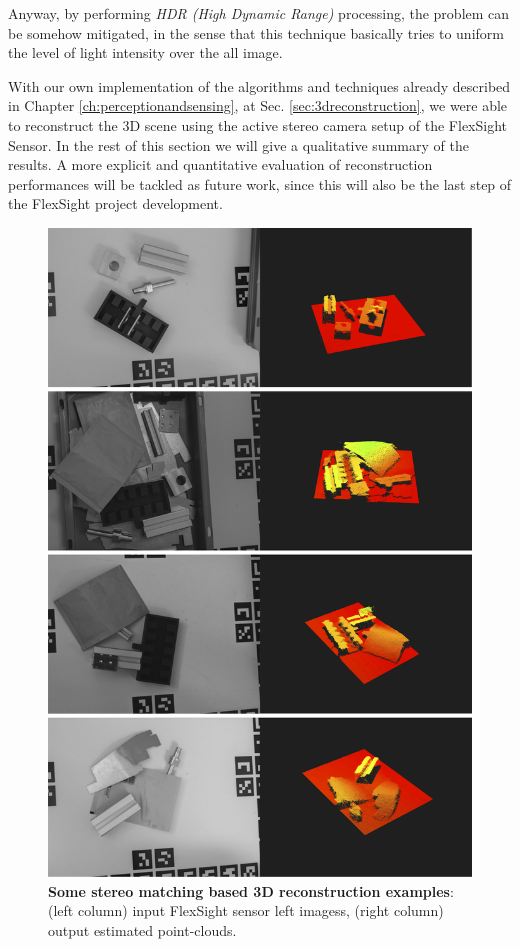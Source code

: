 Anyway, by performing \emph{HDR (High Dynamic Range)} processing, the problem can be somehow mitigated, in the sense that this technique basically tries to uniform the level of light intensity over the all image.

With our own implementation of the algorithms and techniques already described in Chapter \ref{ch:perceptionandsensing}, at Sec. \ref{sec:3dreconstruction}, we were able to reconstruct the 3D scene using the active stereo camera setup of the FlexSight Sensor. In the rest of this section we will give a qualitative summary of the results. A more explicit and quantitative evaluation of reconstruction performances will be tackled as future work, since this will also be the last step of the FlexSight project development.

\begin{figure}
    \centering
    \includegraphics[width=\textwidth]{figures/4_experiments/3d_reconst_ex}
    \caption{\textbf{Some stereo matching based 3D reconstruction examples}: (left column) input FlexSight sensor left imagess, (right column) output estimated point-clouds.}
    \label{fig:3d_reconst_ex}
\end{figure}

